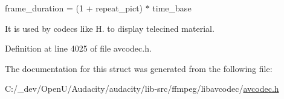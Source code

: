frame\+\_\+duration = (1 + repeat\+\_\+pict) $\ast$ time\+\_\+base

It is used by codecs like H. to display telecined material. 

Definition at line 4025 of file avcodec.\+h.



The documentation for this struct was generated from the following file\+:\begin{DoxyCompactItemize}
\item 
C\+:/\+\_\+dev/\+Open\+U/\+Audacity/audacity/lib-\/src/ffmpeg/libavcodec/\hyperlink{avcodec_8h}{avcodec.\+h}\end{DoxyCompactItemize}
